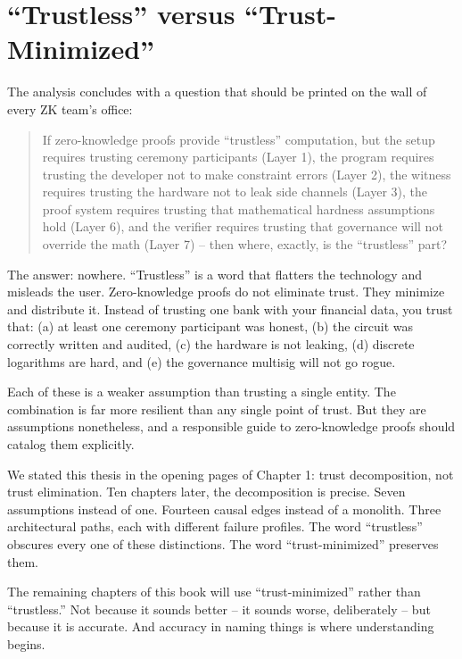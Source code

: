 \documentclass[
  11pt,
  openany]{report}
\begin{document}
\section{``Trustless'' versus
``Trust-Minimized''}\label{trustless-versus-trust-minimized}

The analysis concludes with a question that should be printed on the wall of
every ZK team's office:

\begin{quote}
If zero-knowledge proofs provide ``trustless'' computation, but the setup
requires trusting ceremony participants (Layer 1), the program requires trusting
the developer not to make constraint errors (Layer 2), the witness requires
trusting the hardware not to leak side channels (Layer 3), the proof system
requires trusting that mathematical hardness assumptions hold (Layer 6), and the
verifier requires trusting that governance will not override the math (Layer 7)
-- then where, exactly, is the ``trustless'' part?
\end{quote}

The answer: nowhere. ``Trustless'' is a word that flatters the technology and
misleads the user. Zero-knowledge proofs do not eliminate trust. They minimize
and distribute it. Instead of trusting one bank with your financial data, you
trust that: (a) at least one ceremony participant was honest, (b) the circuit
was correctly written and audited, (c) the hardware is not leaking, (d) discrete
logarithms are hard, and (e) the governance multisig will not go rogue.

Each of these is a weaker assumption than trusting a single entity. The
combination is far more resilient than any single point of trust. But they are
assumptions nonetheless, and a responsible guide to zero-knowledge proofs should
catalog them explicitly.

We stated this thesis in the opening pages of Chapter 1: trust decomposition,
not trust elimination. Ten chapters later, the decomposition is precise. Seven
assumptions instead of one. Fourteen causal edges instead of a monolith. Three
architectural paths, each with different failure profiles. The word
``trustless'' obscures every one of these distinctions. The word
``trust-minimized'' preserves them.

The remaining chapters of this book will use ``trust-minimized'' rather than
``trustless.'' Not because it sounds better -- it sounds worse, deliberately --
but because it is accurate. And accuracy in naming things is where understanding
begins.
\end{document}
